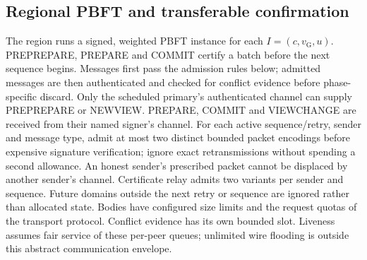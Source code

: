 \documentclass[11pt,a4paper,onecolumn]{article}
\newcommand{\gv}{v_{\mathrm G}}
\theoremstyle{remark}\newtheorem{example}[definition]{Example}
\newcounter{protocol}
\begin{document}
\subsection{Regional PBFT and transferable confirmation}\label{sec:regional}
The region runs a signed, weighted PBFT instance for each $I=(c,\gv,u)$.
PREPREPARE, PREPARE and COMMIT certify a batch before the next sequence begins.
Messages first pass the admission rules below; admitted messages are then
authenticated and checked for conflict evidence before phase-specific discard.
Only the scheduled primary's authenticated channel can supply PREPREPARE or
NEWVIEW. PREPARE, COMMIT and VIEWCHANGE are received from their named signer's
channel. For each active sequence/retry, sender and message type, admit at most
two distinct bounded packet encodings before expensive signature verification;
ignore exact retransmissions without spending a second allowance. An honest
sender's prescribed packet cannot be displaced by another sender's channel.
Certificate relay admits two variants per sender and sequence. Future domains
outside the next retry or sequence are ignored rather than allocated state.
Bodies have configured size limits and the request quotas of the transport
protocol. Conflict evidence has its own bounded slot. Liveness assumes fair
service of these per-peer queues; unlimited wire flooding is outside this
abstract communication envelope.
\end{document}
